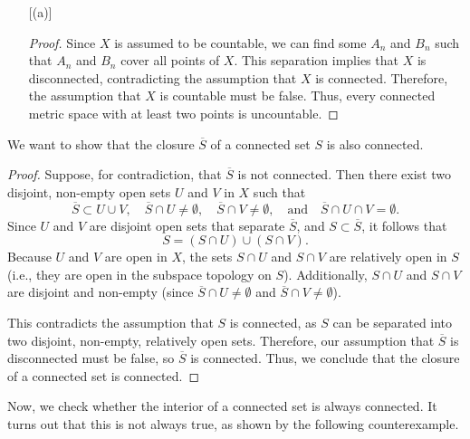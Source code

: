 \documentclass[12pt]{article}
\begin{document}
\begin{exercise}{19}
\begin{enumerate} [(a)]
\begin{proof}
    Since \( X \) is assumed to be countable, we can find some \( A_n \) and \( B_n \) such that \( A_n \) and \( B_n \) cover all points of \( X \). This separation implies that \( X \) is disconnected, contradicting the assumption that \( X \) is connected. Therefore, the assumption that \( X \) is countable must be false. Thus, every connected metric space with at least two points is uncountable.
        \end{proof} 
    \end{enumerate}
\end{exercise}

\begin{exercise}{20}
We want to show that the closure \( \overline{S} \) of a connected set \( S \) is also connected.

\begin{proof}
    Suppose, for contradiction, that \( \overline{S} \) is not connected. Then there exist two disjoint, non-empty open sets \( U \) and \( V \) in \( X \) such that
\[
\overline{S} \subset U \cup V, \quad \overline{S} \cap U \neq \emptyset, \quad \overline{S} \cap V \neq \emptyset, \quad \text{and} \quad \overline{S} \cap U \cap V = \emptyset.
\]
Since \( U \) and \( V \) are disjoint open sets that separate \( \overline{S} \), and \( S \subset \overline{S} \), it follows that
\[
S = (S \cap U) \cup (S \cap V).
\]
Because \( U \) and \( V \) are open in \( X \), the sets \( S \cap U \) and \( S \cap V \) are relatively open in \( S \) (i.e., they are open in the subspace topology on \( S \)). Additionally, \( S \cap U \) and \( S \cap V \) are disjoint and non-empty (since \( \overline{S} \cap U \neq \emptyset \) and \( \overline{S} \cap V \neq \emptyset \)).

This contradicts the assumption that \( S \) is connected, as \( S \) can be separated into two disjoint, non-empty, relatively open sets. Therefore, our assumption that \( \overline{S} \) is disconnected must be false, so \( \overline{S} \) is connected. Thus, we conclude that the closure of a connected set is connected.
\end{proof}

Now, we check whether the interior of a connected set is always connected. It turns out that this is not always true, as shown by the following counterexample.


\end{exercise}
\end{document}
